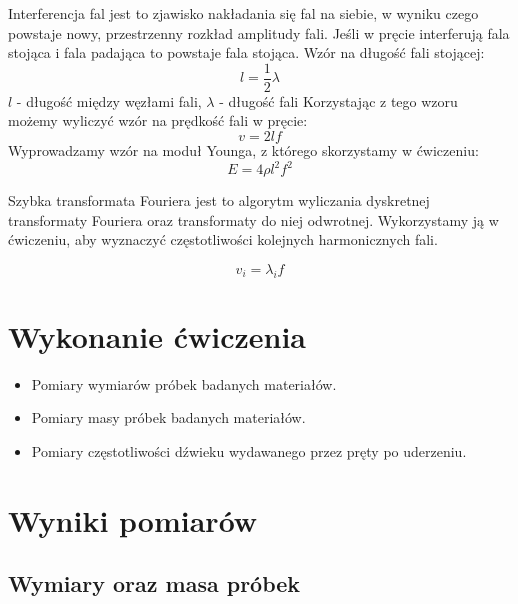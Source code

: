 \documentclass[a4paper,10pt,twoside]{article}
\begin{document}
Interferencja fal jest to zjawisko nakładania się fal na siebie, w wyniku czego powstaje nowy, przestrzenny rozkład amplitudy fali.	Jeśli w pręcie interferują fala stojąca i fala padająca to powstaje fala stojąca.
Wzór na długość fali stojącej:
$$l=\frac{1}{2}\lambda$$
$l$ - długość między węzłami fali, $\lambda$ - długość fali
Korzystając z tego wzoru możemy wyliczyć wzór na prędkość fali w pręcie:
$$v=2lf$$
Wyprowadzamy wzór na moduł Younga, z którego skorzystamy w ćwiczeniu:
$$E=4\rho l^2 f^2$$

Szybka transformata Fouriera jest to algorytm wyliczania dyskretnej transformaty Fouriera oraz transformaty do niej odwrotnej. Wykorzystamy ją w ćwiczeniu, aby wyznaczyć częstotliwości kolejnych harmonicznych fali.

$$ v_i = \lambda_if $$




\section{Wykonanie ćwiczenia}

\begin{itemize}
	\item Pomiary wymiarów próbek badanych materiałów.
	\item Pomiary masy próbek badanych materiałów.
	\item Pomiary częstotliwości dźwieku wydawanego przez pręty po uderzeniu.
\end{itemize}

\section{Wyniki pomiarów}

\subsection{Wymiary oraz masa próbek}
\end{document}
